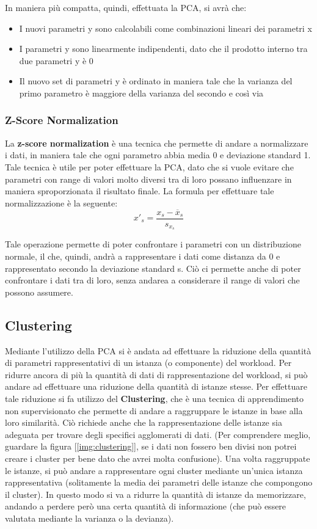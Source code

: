 In maniera più compatta, quindi, effettuata la PCA, si avrà che:
\begin{itemize}
    \item I nuovi parametri y sono calcolabili come combinazioni lineari dei parametri x
    \item I parametri y sono linearmente indipendenti, dato che il prodotto interno tra due parametri y è 0
    \item Il nuovo set di parametri y è ordinato in maniera tale che la varianza del primo parametro è maggiore della varianza del secondo e così via
\end{itemize}

\subsubsection{Z-Score Normalization}
La \textbf{z-score normalization} è una tecnica che permette di andare a normalizzare i dati, in maniera tale che ogni parametro abbia media 0 e deviazione standard 1. Tale tecnica è utile per poter effettuare la PCA, dato che si vuole evitare che parametri con range di valori molto diversi tra di loro possano influenzare in maniera sproporzionata il risultato finale. La formula per effettuare tale normalizzazione è la seguente:
\[
x'_s = \frac{x_{s} - \overline{x}_s}{s_{x_s}}
\]

Tale operazione permette di poter confrontare i parametri con un distribuzione normale, il che, quindi, andrà a rappresentare i dati come distanza da 0 e rappresentato secondo la deviazione standard s. Ciò ci permette anche di poter confrontare i dati tra di loro, senza andarea a considerare il range di valori che possono assumere.

\subsection{Clustering}
Mediante l'utilizzo della PCA si è andata ad effettuare la riduzione della quantità di parametri rappresentativi di un istanza (o componente) del workload. Per ridurre ancora di più la quantità di dati di rappresentazione del workload, si può andare ad effettuare una riduzione della quantità di istanze stesse. Per effettuare tale riduzione si fa utilizzo del \textbf{Clustering}, che è una tecnica di apprendimento non supervisionato che permette di andare a raggruppare le istanze in base alla loro similarità. Ciò richiede anche che la rappresentazione delle istanze sia adeguata per trovare degli specifici agglomerati di dati. (Per comprendere meglio, guardare la figura [\ref{img:clustering}], se i dati non fossero ben divisi non potrei creare i cluster per bene dato che avrei molta confusione). Una volta raggruppate le istanze, si può andare a rappresentare ogni cluster mediante un'unica istanza rappresentativa (solitamente la media dei parametri delle istanze che compongono il cluster). In questo modo si va a ridurre la quantità di istanze da memorizzare, andando a perdere però una certa quantità di informazione (che può essere valutata mediante la varianza o la devianza).

